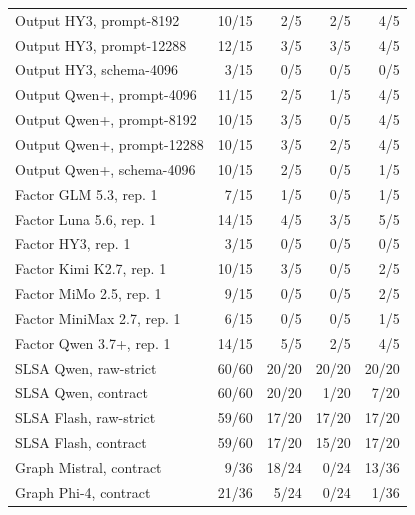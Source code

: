 \documentclass[10pt]{article}
\begin{document}
\begin{table}[htbp]
\begin{tabular}{@{}lrrrr@{}}
Output HY3, prompt-8192 & 10/15 & 2/5 & 2/5 & 4/5 \\
Output HY3, prompt-12288 & 12/15 & 3/5 & 3/5 & 4/5 \\
Output HY3, schema-4096 & 3/15 & 0/5 & 0/5 & 0/5 \\
Output Qwen+, prompt-4096 & 11/15 & 2/5 & 1/5 & 4/5 \\
Output Qwen+, prompt-8192 & 10/15 & 3/5 & 0/5 & 4/5 \\
Output Qwen+, prompt-12288 & 10/15 & 3/5 & 2/5 & 4/5 \\
Output Qwen+, schema-4096 & 10/15 & 2/5 & 0/5 & 1/5 \\
Factor GLM 5.3, rep. 1 & 7/15 & 1/5 & 0/5 & 1/5 \\
Factor Luna 5.6, rep. 1 & 14/15 & 4/5 & 3/5 & 5/5 \\
Factor HY3, rep. 1 & 3/15 & 0/5 & 0/5 & 0/5 \\
Factor Kimi K2.7, rep. 1 & 10/15 & 3/5 & 0/5 & 2/5 \\
Factor MiMo 2.5, rep. 1 & 9/15 & 0/5 & 0/5 & 2/5 \\
Factor MiniMax 2.7, rep. 1 & 6/15 & 0/5 & 0/5 & 1/5 \\
Factor Qwen 3.7+, rep. 1 & 14/15 & 5/5 & 2/5 & 4/5 \\
SLSA Qwen, raw-strict & 60/60 & 20/20 & 20/20 & 20/20 \\
SLSA Qwen, contract & 60/60 & 20/20 & 1/20 & 7/20 \\
SLSA Flash, raw-strict & 59/60 & 17/20 & 17/20 & 17/20 \\
SLSA Flash, contract & 59/60 & 17/20 & 15/20 & 17/20 \\
Graph Mistral, contract & 9/36 & 18/24 & 0/24 & 13/36 \\
Graph Phi-4, contract & 21/36 & 5/24 & 0/24 & 1/36 \\
\bottomrule
\end{tabular}
\end{table}
\end{document}

